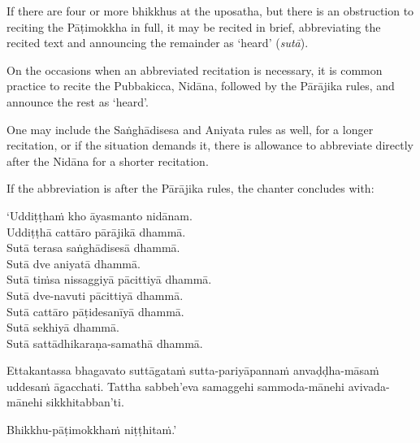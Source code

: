 If there are four or more bhikkhus at the uposatha, but there is an obstruction
to reciting the Pāṭimokkha in full, it may be recited in brief, abbreviating the
recited text and announcing the remainder as `heard' (\emph{sutā}).

On the occasions when an abbreviated recitation is necessary, it is common
practice to recite the Pubbakicca, Nidāna, followed by the Pārājika rules, and
announce the rest as `heard'.

One may include the Saṅghādisesa and Aniyata rules as well, for a longer
recitation, or if the situation demands it, there is allowance to abbreviate
directly after the Nidāna for a shorter recitation.

If the abbreviation is after the Pārājika rules, the chanter concludes with:

\vspace*{\parskip}

\begin{paritta}
`Uddiṭṭhaṁ kho āyasmanto nidānam.\\
Uddiṭṭhā cattāro pārājikā dhammā.\\
Sutā terasa saṅghādisesā dhammā.\\
Sutā dve aniyatā dhammā.\\
Sutā tiṁsa nissaggiyā pācittiyā dhammā.\\
Sutā dve-navuti pācittiyā dhammā.\\
Sutā cattāro pāṭidesanīyā dhammā.\\
Sutā sekhiyā dhammā.\\
Sutā sattādhikaraṇa-samathā dhammā.

Ettakantassa bhagavato suttāgataṁ sutta-pariyāpannaṁ anvaḍḍha-māsaṁ uddesaṁ āgacchati.
Tattha sabbeh'eva samaggehi sammoda-mānehi avivada-mānehi sikkhitabban'ti.

Bhikkhu-pāṭimokkhaṁ niṭṭhitaṁ.'
\end{paritta}


